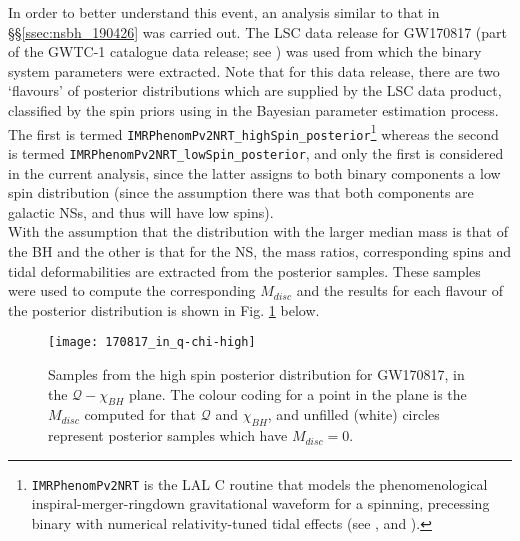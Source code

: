         In order to better understand this event, an analysis similar to that in
        \S\S\ref{ssec:nsbh_190426} was carried out. The LSC data release for GW170817
        (part of the GWTC-1 catalogue data release; see \cite{gwtc1_DR}) was used from
        which the binary system parameters were extracted. Note that for this data
        release, there are two `flavours' of posterior distributions which are supplied
        by the LSC data product, classified by the spin priors using in the Bayesian
        parameter estimation process.  The first is termed
        \texttt{IMRPhenomPv2NRT\_highSpin\_posterior}\footnote
        {
            \texttt{IMRPhenomPv2NRT} is the LAL C routine that models the
            phenomenological inspiral-merger-ringdown gravitational waveform for a
            spinning, precessing binary with numerical relativity-tuned tidal effects
            (see \cite{lalsuite}, and \cite{dietrich_2019}).
        }
        whereas the second is termed \texttt{IMRPhenomPv2NRT\_lowSpin\_posterior}, and
        only the first is considered in the current analysis, since the latter assigns
        to both binary components a low spin distribution (since the assumption there
        was that both components are galactic NSs, and thus will have low spins).\\
        With the assumption that the distribution with the larger median mass is that of
        the BH and the other is that for the NS, the mass ratios, corresponding spins
        and tidal deformabilities are extracted from the posterior samples. These
        samples were used to compute the corresponding $M_{disc}$ and the results for
        each flavour of the posterior distribution is shown in Fig.
        \ref{fig:170817_high} below.

        \begin{figure}[ht]
            \centering
            \texttt{[image: 170817\_in\_q-chi-high]}
            \caption[$M_{disc}$ for GW170817's High Spin Posterior Distribution]
            {
                Samples from the high spin posterior distribution for GW170817, in the
                $\mathcal{Q}-\chi_{BH}$ plane. The colour coding for a point in the plane
                is the $M_{disc}$ computed for that $\mathcal{Q}$ and $\chi_{BH}$, and
                unfilled (white) circles represent posterior samples which have
                $M_{disc} = 0$.
            }
            \label{fig:170817_high}
        \end{figure}

